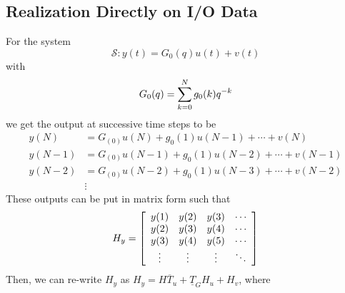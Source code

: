 \subsection{Realization Directly on I/O Data}
For the system
$$\mathcal{S}: y(t) = G_0(q)u(t)+v(t)$$
with
$$G_0(q)=\sum_{k=0}^N g_0(k)q^{-k}$$
we get the output at successive time steps to be
\begin{align*}
y(N) &= G_(0)u(N) + g_0(1)u(N-1) + \cdots + v(N) \\
y(N-1) &= G_(0)u(N-1) + g_0(1)u(N-2) + \cdots + v(N-1) \\
y(N-2) &= G_(0)u(N-2) + g_0(1)u(N-3) + \cdots + v(N-2) \\
&\vdots
\end{align*}
These outputs can be put in matrix form such that
\begin{align*}
H_y = \left[\begin{array}{c c c c}
y(1) & y(2) & y(3) & \cdots \\
y(2) & y(3) & y(4) & \cdots \\
y(3) & y(4) & y(5) & \cdots \\
\vdots & \vdots & \vdots & \ddots
\end{array}\right]
\end{align*}
Then, we can re-write $H_y$ as $H_y=H\overline{T}_u+\underline{T}_GH_u+H_v$, where
